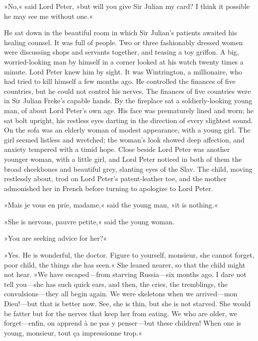 »No,« said Lord Peter, »but will you give Sir Julian my card? I think it possible he may see me without one.«

He sat down in the beautiful room in which Sir Julian's patients awaited his healing counsel. It was full of people. Two or three fashionably dressed women were discussing shops and servants together, and teasing a toy griffon. A big, worried-looking man by himself in a corner looked at his watch twenty times a minute. Lord Peter knew him by sight. It was Wintrington, a millionaire, who had tried to kill himself a few months ago. He controlled the finances of five countries, but he could not control his nerves. The finances of five countries were in Sir Julian Freke's capable hands. By the fireplace sat a soldierly-looking young man, of about Lord Peter's own age. His face was prematurely lined and worn; he sat bolt upright, his restless eyes darting in the direction of every slightest sound. On the sofa was an elderly woman of modest appearance, with a young girl. The girl seemed listless and wretched; the woman's look showed deep affection, and anxiety tempered with a timid hope. Close beside Lord Peter was another younger woman, with a little girl, and Lord Peter noticed in both of them the broad cheekbones and beautiful grey, slanting eyes of the Slav. The child, moving restlessly about, trod on Lord Peter's patent-leather toe, and the mother admonished her in French before turning to apologize to Lord Peter.

»Mais je vous en prie, madame,« said the young man, »it is nothing.«

»She is nervous, pauvre petite,« said the young woman.

»You are seeking advice for her?«

»Yes. He is wonderful, the doctor. Figure to yourself, monsieur, she cannot forget, poor child, the things she has seen.« She leaned nearer, so that the child might not hear. »We have escaped\allowbreak---\allowbreak from starving Russia\allowbreak---\allowbreak six months ago. I dare not tell you\allowbreak---\allowbreak she has such quick ears, and then, the cries, the tremblings, the convulsions\allowbreak---\allowbreak they all begin again. We were skeletons when we arrived\allowbreak---\allowbreak mon Dieu!---but that is better now. See, she is thin, but she is not starved. She would be fatter but for the nerves that keep her from eating. We who are older, we forget\allowbreak---\allowbreak enfin, on apprend à ne pas y penser\allowbreak---\allowbreak but these children! When one is young, monsieur, tout ça impressionne trop.«

